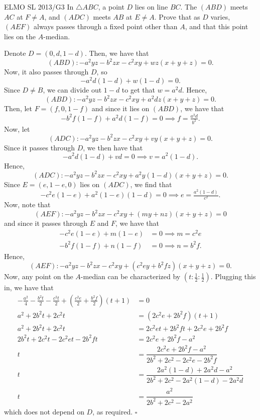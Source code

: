 \documentclass{article}
\begin{document}
\begin{problem}[7.35]{ELMO SL 2013/G3}
In $\triangle ABC$, a point $D$ lies on line $BC$. The $(ABD)$ meets $AC$ at $F \neq A$, and $(ADC)$ meets $AB$ at $E \neq A$. Prove that as $D$ varies, $(AEF)$ always passes through a fixed point other than $A$, and that this point lies on the $A$-median.
\end{problem}
Denote $D = (0, d, 1-d)$. Then, we have that \[(ABD): -a^2yz-b^2zx-c^2xy + wz(x+y+z) = 0.\] Now, it also passes through $D$, so \[-a^2d(1-d)+w(1-d) = 0.\] Since $D \neq B$, we can divide out $1-d$ to get that $w = a^2d$. Hence, \[(ABD): -a^2yz-b^2zx-c^2xy + a^2dz(x+y+z) = 0.\] Then, let $F = (f, 0, 1-f)$ and since it lies on $(ABD)$, we have that \[-b^2f(1-f)+a^2d(1-f) = 0 \implies f = \tfrac{a^2d}{b^2}.\] Now, let \[(ADC): -a^2yz-b^2zx-c^2xy + vy(x+y+z) = 0.\] Since it passes through $D$, we then have that \[-a^2d(1-d)+vd = 0 \implies v = a^2(1-d).\] Hence, \[(ADC): -a^2yz-b^2zx-c^2xy + a^2y(1-d)(x+y+z) = 0.\] Since $E = (e, 1-e, 0)$ lies on $(ADC)$, we find that \[-c^2e(1-e)+a^2(1-e)(1-d) = 0 \implies e = \tfrac{a^2(1-d)}{c^2}.\] Now, note that \[(AEF) : -a^2yz-b^2zx-c^2xy+(my+nz)(x+y+z) = 0\] and since it passes through $E$ and $F$, we have that
\begin{align*}
-c^2e(1-e)+m(1-e) &= 0 \implies m = c^2e \\
-b^2f(1-f)+n(1-f) &= 0 \implies n = b^2f.
\end{align*}
Hence, \[(AEF) : -a^2yz-b^2zx-c^2xy+(c^2ey+b^2fz)(x+y+z) = 0.\] Now, any point on the $A$-median can be characterized by $\left(t : \tfrac{1}{2} : \tfrac{1}{2}\right)$. Plugging this in, we have that
\begin{align*}
-\tfrac{a^2}{4}-\tfrac{b^2t}{2}-\tfrac{c^2t}{2}+\left(\frac{c^2e}{2}+\tfrac{b^2f}{2}\right)(t+1) &= 0 \\
a^2+2b^2t+2c^2t &= (2c^2e+2b^2f)(t+1) \\
a^2+2b^2t+2c^2t &= 2c^2et+2b^2ft+2c^2e+2b^2f \\
2b^2t+2c^2t-2c^2et-2b^2ft &= 2c^2e+2b^2f-a^2 \\
t &= \dfrac{2c^2e+2b^2f-a^2}{2b^2+2c^2-2c^2e-2b^2f} \\
t &= \dfrac{2a^2(1-d)+2a^2d-a^2}{2b^2+2c^2-2a^2(1-d)-2a^2d} \\
t &= \dfrac{a^2}{2b^2+2c^2-2a^2}
\end{align*}
which does not depend on $D$, as required. $\square$
\end{document}

